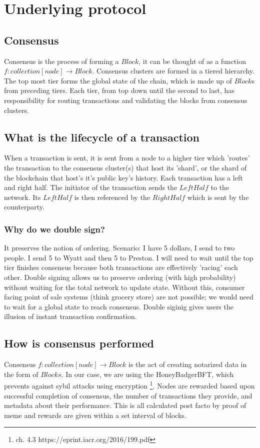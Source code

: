 \documentclass{article}
\begin{document}
\section{Underlying protocol}
\subsection{Consensus}
Consensus is the process of forming a $Block$, it can be thought of as a function $f: collection[node] \rightarrow Block$. Consensus clusters are formed in a tiered hierarchy. The top most tier forms the global state of the chain, which is made up of $Block$s from preceding tiers. Each tier, from top down until the second to last, has responsibility for routing transactions and validating the blocks from consensus clusters. 

\subsection{What is the lifecycle of a transaction}
When a transaction is sent, it is sent from a node to a higher tier which 'routes' the transaction to the consensus cluster(s) that host its 'shard', or the shard of the blockchain that host's it's public key's history. Each transaction has a left and right half. The initiator of the transaction sends the $LeftHalf$ to the network. Its $LeftHalf$ is then referenced by the $RightHalf$ which is sent by the counterparty.

\subsubsection{Why do we double sign?}
It preserves the notion of ordering. Scenario: I have 5 dollars, I send to two people. I send 5 to Wyatt and then 5 to Preston. I will need to wait until the top tier finishes consensus because both transactions are effectively 'racing' each other. Double signing allows us to preserve ordering (with high probability) without waiting for the total network to update state. Without this, consumer facing point of sale systems (think grocery store) are not possible; we would need to wait for a global state to reach consensus. Double siginig gives users the illusion of instant transaction confirmation.

\subsection{How is consensus performed}
Consensus $f: collection[node] \rightarrow  Block$ is the act of creating notarized data in the form of $Blocks$. In our case, we are using the HoneyBadgerBFT, which prevents against sybil attacks using encryption \footnote{ch. 4.3 https://eprint.iacr.org/2016/199.pdf}. Nodes are rewarded based upon successful completion of consensus, the number of transactions they provide, and metadata about their performance. This is all calculated post facto by proof of meme and rewards are given within a set interval of blocks.
\end{document}
